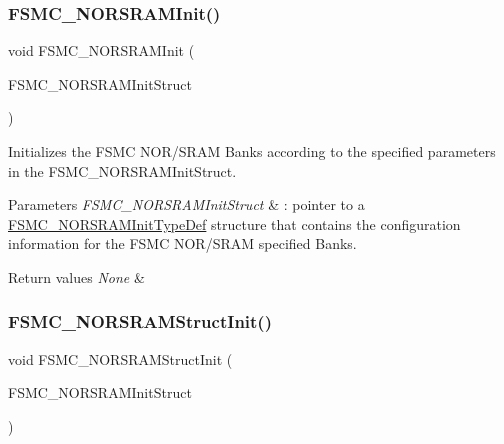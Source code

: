 \subsubsection{\texorpdfstring{FSMC\_NORSRAMInit()}{FSMC\_NORSRAMInit()}}
{\footnotesize\ttfamily void F\+S\+M\+C\+\_\+\+N\+O\+R\+S\+R\+A\+M\+Init (\begin{DoxyParamCaption}\item[{\mbox{\hyperlink{struct_f_s_m_c___n_o_r_s_r_a_m_init_type_def}{F\+S\+M\+C\+\_\+\+N\+O\+R\+S\+R\+A\+M\+Init\+Type\+Def}} $\ast$}]{F\+S\+M\+C\+\_\+\+N\+O\+R\+S\+R\+A\+M\+Init\+Struct }\end{DoxyParamCaption})}



Initializes the F\+S\+MC N\+O\+R/\+S\+R\+AM Banks according to the specified parameters in the F\+S\+M\+C\+\_\+\+N\+O\+R\+S\+R\+A\+M\+Init\+Struct. 


\begin{DoxyParams}{Parameters}
{\em F\+S\+M\+C\+\_\+\+N\+O\+R\+S\+R\+A\+M\+Init\+Struct} & \+: pointer to a \mbox{\hyperlink{struct_f_s_m_c___n_o_r_s_r_a_m_init_type_def}{F\+S\+M\+C\+\_\+\+N\+O\+R\+S\+R\+A\+M\+Init\+Type\+Def}} structure that contains the configuration information for the F\+S\+MC N\+O\+R/\+S\+R\+AM specified Banks.\\
\hline
\end{DoxyParams}

\begin{DoxyRetVals}{Return values}
{\em None} & \\
\hline
\end{DoxyRetVals}
\mbox{\label{group___f_s_m_c___private___functions_gaf33e6dfc34f62d16a0cb416de9e83d28}} 
\subsubsection{\texorpdfstring{FSMC\_NORSRAMStructInit()}{FSMC\_NORSRAMStructInit()}}
{\footnotesize\ttfamily void F\+S\+M\+C\+\_\+\+N\+O\+R\+S\+R\+A\+M\+Struct\+Init (\begin{DoxyParamCaption}\item[{\mbox{\hyperlink{struct_f_s_m_c___n_o_r_s_r_a_m_init_type_def}{F\+S\+M\+C\+\_\+\+N\+O\+R\+S\+R\+A\+M\+Init\+Type\+Def}} $\ast$}]{F\+S\+M\+C\+\_\+\+N\+O\+R\+S\+R\+A\+M\+Init\+Struct }\end{DoxyParamCaption})}




